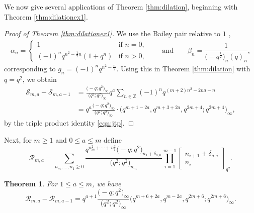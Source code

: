 \documentclass[pdftex]{sigma}
\newtheorem{Theorem}{Theorem}[section]
\numberwithin{equation}{section}
\begin{document}
We now give several applications of Theorem \ref{thm:dilation}, beginning with Theorem \ref{thm:dilationex1}.

\begin{proof}[Proof of Theorem \ref{thm:dilationex1}]
We use the Bailey pair relative to $1$ \cite[p.~468]{Sl1},
\begin{align*}
	\alpha_n=
	\begin{cases}
		1 & \text{if $n=0$},\\
		(-1)^nq^{n^2-\frac{1}{2}n}(1+q^n) & \text{if $n>0$},
	\end{cases}
\qquad
\text{and}
\qquad
	\beta_n=\dfrac{1}{\bigl(-q^{\frac{1}{2}}\bigr)_n(q)_n},
\end{align*}
corresponding to $g_n = (-1)^nq^{n^2-\frac{n}{2}}$. Using this in Theorem \ref{thm:dilation} with $q=q^2$,
we obtain
\begin{align*}
	\mathscr{S}_{m,a} - \mathscr{S}_{m,a-1} &{}= \frac{\bigl(-q;q^2\bigr)_{\infty}}{\bigl(q^2;q^2\bigr)_{\infty}} q^{a}\sum_{n\in \mathbb{Z}}(-1)^nq^{(m+2)n^2-2na-n} \\
	&{}=q^{a}\frac{\bigl(-q;q^2\bigr)_{\infty}}{\bigl(q^2;q^2\bigr)_{\infty}}\cdot\bigl(q^{m+1-2a},q^{m+3+2a},q^{2m+4};q^{2m+4}\bigr)_\infty,
\end{align*}
by the triple product identity \eqref{eqn:jtp}.
\end{proof}

Next, for $m \geq 1$ and $0 \leq a \leq m$ define
\begin{equation*}
\mathscr{R}_{m,a} = \sum_{n_m, \dots, n_1 \geq 0} \frac{q^{n_m^2 + \cdots + n_1^2}\bigl(-q;q^2\bigr)_{n_1 + \delta_{a,0}}}{\bigl(q^2;q^2\bigr)_{n_m}} \prod_{i=1}^{m-1} \begin{bmatrix} n_{i+1} + \delta_{a,i} \\ n_i \end{bmatrix}_{q^2}.
\end{equation*}
\begin{Theorem}
For $1 \leq a \leq m$, we have
\begin{equation*}
	\mathscr{R}_{m,a} - \mathscr{R}_{m,a-1} = q^{a+1}\frac{\bigl(-q;q^2\bigr)_{\infty}}{\bigl(q^2;q^2\bigr)_{\infty}}\bigl(q^{m+6+2a},q^{m-2a},q^{2m+6};q^{2m+6}\bigr)_{\infty}.
\end{equation*}
\end{Theorem}
\end{document}
